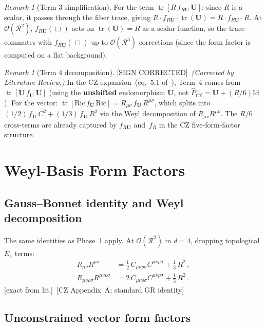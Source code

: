 \documentclass[12pt,a4paper]{article}
\theoremstyle{definition}
\theoremstyle{remark}
\newtheorem{remark}[proposition]{Remark}
\newcommand{\tr}{\operatorname{tr}}
\newcommand{\Rsq}{R_{\mu\nu\rho\sigma}R^{\mu\nu\rho\sigma}}
\newcommand{\Ricsq}{R_{\mu\nu}R^{\mu\nu}}
\newcommand{\Weylsq}{C_{\mu\nu\rho\sigma}C^{\mu\nu\rho\sigma}}
\newcommand{\Id}{\mathrm{Id}}
\newcommand{\fromlit}[1]{\textcolor{blue!70!black}{\textsf{[#1]}}}
\newcommand{\exactlit}{\textcolor{blue!60!black}{\textsf{[exact from lit.]}}}
\newcommand{\signcorrection}{\textcolor{red!60!black}{\textsf{[SIGN CORRECTED]}}}
\begin{document}
\begin{remark}[Term 3 simplification]
For the term $\tr[R\,f_{R\mathbf{U}}\,\mathbf{U}]$: since $R$ is
a scalar, it passes through the fiber trace, giving
$R\cdot f_{R\mathbf{U}}\cdot\tr(\mathbf{U})
= R\cdot f_{R\mathbf{U}}\cdot R$.
At $\mathcal{O}(\mathcal{R}^2)$, $f_{R\mathbf{U}}(\Box)$ acts on
$\tr(\mathbf{U}) = R$ as a scalar function, so the trace commutes
with $f_{R\mathbf{U}}(\Box)$ up to $\mathcal{O}(\mathcal{R}^3)$
corrections (since the form factor is computed on a flat background).
\end{remark}

\begin{remark}[Term 4 decomposition]
\signcorrection\ \textit{(Corrected by Literature Review.)}
In the CZ expansion~(eq.~5.1 of~\cite{CZ2012}), Term~4 comes from
$\tr[\mathbf{U}\,f_{\mathbf{U}}\,\mathbf{U}]$
(using the \textbf{unshifted} endomorphism $\mathbf{U}$, not
$\hat{P}_{\mathrm{CZ}} = \mathbf{U}+(R/6)\Id$).
For the vector: $\tr[\mathrm{Ric}\,f_{\mathbf{U}}\,\mathrm{Ric}]
= R_{\mu\nu}\,f_{\mathbf{U}}\,R^{\mu\nu}$, which splits into
$(1/2)\,f_{\mathbf{U}}\,C^2 + (1/3)\,f_{\mathbf{U}}\,R^2$ via
the Weyl decomposition of $\Ricsq$.
The $R/6$ cross-terms are already captured by $f_{R\mathbf{U}}$ and~$f_R$
in the CZ five-form-factor structure.
\end{remark}


\section{Weyl-Basis Form Factors}
\label{sec:weyl}

\subsection{Gauss--Bonnet identity and Weyl decomposition}

The same identities as Phase~1 apply.
At $\mathcal{O}(\mathcal{R}^2)$ in $d = 4$, dropping topological
$E_4$ terms:
\begin{align}
  \Ricsq &= \frac{1}{2}\,\Weylsq + \frac{1}{3}\,R^2\,,
  \label{eq:weyl-decomp-Ric}\\
  \Rsq &= 2\,\Weylsq + \frac{1}{3}\,R^2\,.
  \label{eq:weyl-decomp-Riem}
\end{align}
\exactlit\ \fromlit{CZ Appendix~A; standard GR identity}


\subsection{Unconstrained vector form factors}
\end{document}
